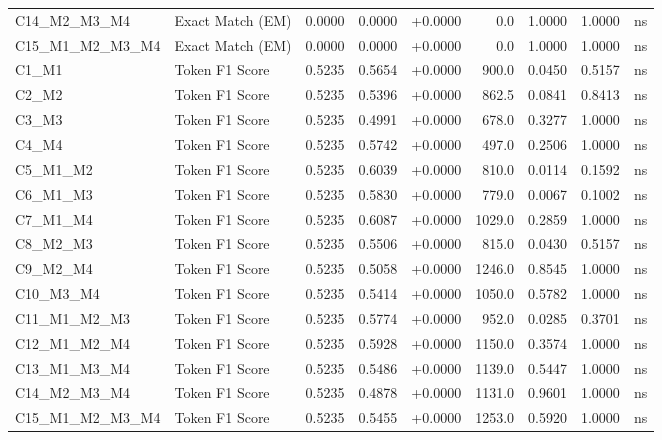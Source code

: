 \begin{table}[p]
\begin{tabular*}{\textwidth}{@{\extracolsep{\fill}} l l r r r r r r c @{}}
\addlinespace
C14\_M2\_M3\_M4 & Exact Match (EM)     & 0.0000 & 0.0000 & +0.0000 & 0.0 & 1.0000 & 1.0000 & ns \\
\addlinespace
C15\_M1\_M2\_M3\_M4 & Exact Match (EM)     & 0.0000 & 0.0000 & +0.0000 & 0.0 & 1.0000 & 1.0000 & ns \\
\addlinespace
C1\_M1          & Token F1 Score       & 0.5235 & 0.5654 & +0.0000 & 900.0 & 0.0450 & 0.5157 & ns \\
\addlinespace
C2\_M2          & Token F1 Score       & 0.5235 & 0.5396 & +0.0000 & 862.5 & 0.0841 & 0.8413 & ns \\
\addlinespace
C3\_M3          & Token F1 Score       & 0.5235 & 0.4991 & +0.0000 & 678.0 & 0.3277 & 1.0000 & ns \\
\addlinespace
C4\_M4          & Token F1 Score       & 0.5235 & 0.5742 & +0.0000 & 497.0 & 0.2506 & 1.0000 & ns \\
\addlinespace
C5\_M1\_M2      & Token F1 Score       & 0.5235 & 0.6039 & +0.0000 & 810.0 & 0.0114 & 0.1592 & ns \\
\addlinespace
C6\_M1\_M3      & Token F1 Score       & 0.5235 & 0.5830 & +0.0000 & 779.0 & 0.0067 & 0.1002 & ns \\
\addlinespace
C7\_M1\_M4      & Token F1 Score       & 0.5235 & 0.6087 & +0.0000 & 1029.0 & 0.2859 & 1.0000 & ns \\
\addlinespace
C8\_M2\_M3      & Token F1 Score       & 0.5235 & 0.5506 & +0.0000 & 815.0 & 0.0430 & 0.5157 & ns \\
\addlinespace
C9\_M2\_M4      & Token F1 Score       & 0.5235 & 0.5058 & +0.0000 & 1246.0 & 0.8545 & 1.0000 & ns \\
\addlinespace
C10\_M3\_M4     & Token F1 Score       & 0.5235 & 0.5414 & +0.0000 & 1050.0 & 0.5782 & 1.0000 & ns \\
\addlinespace
C11\_M1\_M2\_M3 & Token F1 Score       & 0.5235 & 0.5774 & +0.0000 & 952.0 & 0.0285 & 0.3701 & ns \\
\addlinespace
C12\_M1\_M2\_M4 & Token F1 Score       & 0.5235 & 0.5928 & +0.0000 & 1150.0 & 0.3574 & 1.0000 & ns \\
\addlinespace
C13\_M1\_M3\_M4 & Token F1 Score       & 0.5235 & 0.5486 & +0.0000 & 1139.0 & 0.5447 & 1.0000 & ns \\
\addlinespace
C14\_M2\_M3\_M4 & Token F1 Score       & 0.5235 & 0.4878 & +0.0000 & 1131.0 & 0.9601 & 1.0000 & ns \\
\addlinespace
C15\_M1\_M2\_M3\_M4 & Token F1 Score       & 0.5235 & 0.5455 & +0.0000 & 1253.0 & 0.5920 & 1.0000 & ns \\

\end{tabular*}
\end{table}

